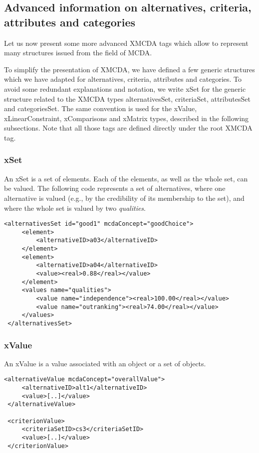 \documentclass[a4paper,oneside,10 pt]{article}
\newcommand{\XMCDA}{{\asciifamily XMCDA}\xspace}
\newcommand{\MCDA}{MCDA\xspace}
\newcommand{\code}{\asciifamily}
\begin{document}
\subsection{Advanced information on alternatives, criteria, attributes and categories}\label{sec:advancedTypes}

Let us now present some more advanced \XMCDA tags which allow to represent many structures issued from the field of \MCDA. 

To simplify the presentation of \XMCDA, we have defined a few generic structures which we have adapted for alternatives, criteria, attributes and categories. To avoid some redundant explanations and notation, we write {\code x}Set for the generic structure related to the \XMCDA types {\code alternativesSet}, {\code criteriaSet}, {\code attributesSet} and {\code categoriesSet}. The same convention is used for the {\code x}Value, {\code x}LinearConstraint, {\code x}Comparisons and {\code x}Matrix types, described in the following subsections. Note that all those tags are defined directly under the root \XMCDA tag.

\subsubsection{{\code x}Set}\label{subsec:xSet}

An {\code x}Set is a set of elements. Each of the elements, as well as the whole set, can be valued. The following code represents a set of alternatives, where one alternative is valued (e.g., by the credibility of its membership to the set), and where the whole set is valued by two {\em qualities}.

{\code
\begin{lstlisting}[style=prototype]
<alternativesSet id="good1" mcdaConcept="goodChoice">
	 <element>
		 <alternativeID>a03</alternativeID>
	 </element>
	 <element>
		 <alternativeID>a04</alternativeID>
		 <value><real>0.88</real></value>
	 </element>
	 <values name="qualities">
		 <value name="independence"><real>100.00</real></value>
		 <value name="outranking"><real>74.00</real></value>
	 </values>
 </alternativesSet>
\end{lstlisting}
} 

\subsubsection{{\code x}Value}

An {\code x}Value is a value associated with an object or a set of objects. 
{\code
\begin{lstlisting}[style=prototype]
 <alternativeValue mcdaConcept="overallValue">
	 <alternativeID>alt1</alternativeID>
	 <value>[..]</value>
 </alternativeValue>

 <criterionValue>
	 <criteriaSetID>cs3</criteriaSetID>
	 <value>[..]</value>
 </criterionValue>
\end{lstlisting}
}
\end{document}
